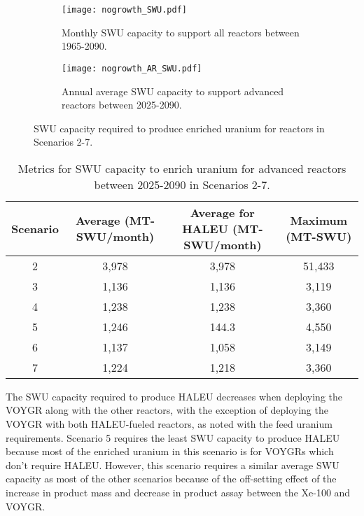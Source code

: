 \begin{figure}[h!]
    \centering
    \begin{subfigure}[b]{0.45\textwidth}
        \centering
        \texttt{[image: nogrowth\_SWU.pdf]}
        \caption{Monthly \gls{SWU} capacity to support all reactors between 1965-2090.}
        \label{fig:nogrowth_all_SWU}
    \end{subfigure}
    \hfill
    \begin{subfigure}[b]{0.45\textwidth}
        \centering
        \texttt{[image: nogrowth\_AR\_SWU.pdf]}
        \caption{Annual average \gls{SWU} capacity to support advanced reactors between 2025-2090.}
        \label{fig:nogrowth_AR_SWU}
    \end{subfigure}
       \caption{\gls{SWU} capacity required to produce enriched uranium 
       for reactors in Scenarios 2-7.}
       \label{fig:nogrowth_swu}
\end{figure}

\begin{table}[h!]
    \centering 
    \caption{Metrics for \gls{SWU} capacity to enrich uranium for 
    advanced reactors between 2025-2090 in Scenarios 2-7.}
    \label{tab:nogrowth_swu}
    \begin{tabular}{c c c c}
        \hline
        Scenario & Average  (MT-SWU/month) & Average
        for \gls{HALEU} (MT-SWU/month) & Maximum (MT-SWU)\\\hline
        2 & 3,978 & 3,978 & 51,433 \\
        3 & 1,136 & 1,136 & 3,119\\
        4 & 1,238 & 1,238 & 3,360\\
        5 & 1,246 & 144.3 & 4,550 \\
        6 & 1,137 & 1,058 & 3,149\\
        7 & 1,224 & 1,218 & 3,360\\
        \hline
    \end{tabular}
\end{table}

The \gls{SWU} capacity required to produce \gls{HALEU} decreases when 
deploying the VOYGR along with the other reactors, with the exception 
of deploying the VOYGR with both \gls{HALEU}-fueled reactors, as noted 
with the feed uranium requirements. 
Scenario 5 requires the least \gls{SWU} capacity to produce 
\gls{HALEU} because most of the enriched uranium in this 
scenario is for VOYGRs which don't require \gls{HALEU}. However, this 
scenario requires a similar average \gls{SWU} capacity as most of the other 
scenarios because of the off-setting effect of the increase in product mass 
and decrease in product assay between the Xe-100 and VOYGR. 


